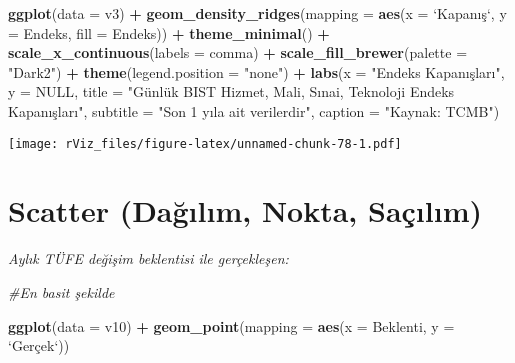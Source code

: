 \documentclass[
]{book}
\newenvironment{Shaded}{\begin{snugshade}}{\end{snugshade}}
\newcommand{\CommentTok}[1]{\textcolor[rgb]{0.56,0.35,0.01}{\textit{#1}}}
\newcommand{\DataTypeTok}[1]{\textcolor[rgb]{0.13,0.29,0.53}{#1}}
\newcommand{\KeywordTok}[1]{\textcolor[rgb]{0.13,0.29,0.53}{\textbf{#1}}}
\newcommand{\NormalTok}[1]{#1}
\newcommand{\OperatorTok}[1]{\textcolor[rgb]{0.81,0.36,0.00}{\textbf{#1}}}
\newcommand{\OtherTok}[1]{\textcolor[rgb]{0.56,0.35,0.01}{#1}}
\newcommand{\StringTok}[1]{\textcolor[rgb]{0.31,0.60,0.02}{#1}}
\begin{document}
\begin{Shaded}
\begin{Highlighting}[]
\KeywordTok{ggplot}\NormalTok{(}\DataTypeTok{data =}\NormalTok{ v3) }\OperatorTok{+}
\StringTok{  }\KeywordTok{geom_density_ridges}\NormalTok{(}\DataTypeTok{mapping =} \KeywordTok{aes}\NormalTok{(}\DataTypeTok{x =} \StringTok{`}\DataTypeTok{Kapanış}\StringTok{`}\NormalTok{, }\DataTypeTok{y =}\NormalTok{ Endeks, }\DataTypeTok{fill =}\NormalTok{ Endeks)) }\OperatorTok{+}
\StringTok{  }\KeywordTok{theme_minimal}\NormalTok{() }\OperatorTok{+}
\StringTok{  }\KeywordTok{scale_x_continuous}\NormalTok{(}\DataTypeTok{labels =}\NormalTok{ comma) }\OperatorTok{+}
\StringTok{  }\KeywordTok{scale_fill_brewer}\NormalTok{(}\DataTypeTok{palette =} \StringTok{"Dark2"}\NormalTok{) }\OperatorTok{+}
\StringTok{  }\KeywordTok{theme}\NormalTok{(}\DataTypeTok{legend.position =} \StringTok{"none"}\NormalTok{) }\OperatorTok{+}
\StringTok{  }\KeywordTok{labs}\NormalTok{(}\DataTypeTok{x =} \StringTok{"Endeks Kapanışları"}\NormalTok{,}
       \DataTypeTok{y =} \OtherTok{NULL}\NormalTok{,}
       \DataTypeTok{title =} \StringTok{"Günlük BIST Hizmet, Mali, Sınai, Teknoloji Endeks Kapanışları"}\NormalTok{,}
       \DataTypeTok{subtitle =} \StringTok{"Son 1 yıla ait verilerdir"}\NormalTok{,}
       \DataTypeTok{caption =} \StringTok{"Kaynak: TCMB"}\NormalTok{)}
\end{Highlighting}
\end{Shaded}

\texttt{[image: rViz\_files/figure-latex/unnamed-chunk-78-1.pdf]}

\hypertarget{scatter-daux11fux131lux131m-nokta-sauxe7ux131lux131m}{%
\section{Scatter (Dağılım, Nokta, Saçılım)}\label{scatter-daux11fux131lux131m-nokta-sauxe7ux131lux131m}}

\emph{Aylık TÜFE değişim beklentisi ile gerçekleşen:}

\begin{Shaded}
\begin{Highlighting}[]
\CommentTok{#En basit şekilde}

\KeywordTok{ggplot}\NormalTok{(}\DataTypeTok{data =}\NormalTok{ v10) }\OperatorTok{+}
\StringTok{  }\KeywordTok{geom_point}\NormalTok{(}\DataTypeTok{mapping =} \KeywordTok{aes}\NormalTok{(}\DataTypeTok{x =}\NormalTok{ Beklenti, }\DataTypeTok{y =} \StringTok{`}\DataTypeTok{Gerçek}\StringTok{`}\NormalTok{))}
\end{Highlighting}
\end{Shaded}
\end{document}
